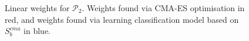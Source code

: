 \begin{figure}\centering
	\caption{Linear weights for $\mathcal{P_2}$. Weights found via CMA-ES optimisation in red, and weights found via learning classification model based on $S_b^{cma}$ in blue.}\label{fig:weights:p2}
\end{figure}


